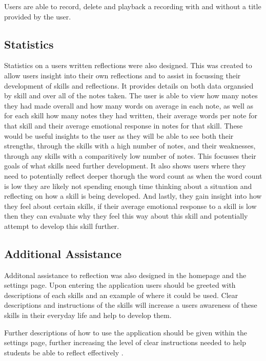 \documentclass{l4proj}
\begin{document}
Users are able to record, delete and playback a recording with and without a title provided by the user. 

\subsection{Statistics}

Statistics on a users written reflections were also designed. This was created to allow users insight into their own reflections and to assist in 
focussing their development of skills and reflections. It provides details on both data organsied by skill and over all of the notes taken. The user is able to 
view how many notes they had made overall and how many words on average in each note, as well as for each skill how many notes they had written, their average
words per note for that skill and their average emotional response in notes for that skill. These would be useful insights to the user as they will be able to 
see both their strengths, through the skills with a high number of notes, and their weaknesses, through any skills with a comparitively low number of notes.
This focusses their goals of what skills need further development. It also shows users where they need to potentially reflect deeper thorugh the word count
as when the word count is low they are likely not spending enough time thinking about a situation and reflecting on how a skill is being developed. And lastly,
they gain insight into how they feel about certain skills, if their average emotional response to a skill is low then they can evaluate why they feel this 
way about this skill and potentially attempt to develop this skill further.


\subsection{Additional Assistance}

Additonal assistance to reflection was also designed in the homepage and the settings page. Upon entering the application users should be greeted with 
descriptions of each skills and an example of where it could be used. Clear descriptions and instructions of the skills will increase a users awareness of these
skills in their everyday life and help to develop them. 

Further descriptions of how to use the application should be given within the settings page, further increasing the level of clear instructions needed
to help students be able to reflect effectively \citep{bruno_reflective_2018}.
\end{document}
